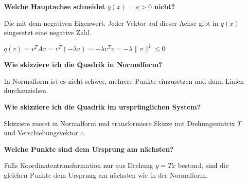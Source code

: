 {\begin{enumerate}[label=\protect\circled{\arabic*}]
\end{enumerate}

\vskip5pt
\textbf{Welche Hauptachse schneidet $q(x) = a > 0$ nicht?} \par
Die mit dem negativen Eigenwert. Jeder Vektor auf dieser Achse gibt in $q(x)$ eingesetzt eine negative Zahl.\par
$q(v) = v^TAv = v^T(-\lambda v) = -\lambda v^Tv = -\lambda \|v\|^2 \leq 0$
\vskip3pt

\textbf{Wie skizziere ich die Quadrik in Normalform?} \par
In Normalform ist es nicht schwer, mehrere Punkte einzusetzen und dann Linien durchzuziehen.\vskip3pt 

\textbf{Wie skizziere ich die Quadrik im ursprünglichen System?} \par
Skizziere zuerst in Normalform und transformiere Skizze mit Drehungsmatrix $T$ und Verschiebungsvektor $c$. \vskip3pt

\textbf{Welche Punkte sind dem Ursprung am nächsten?} \par
Falls Koordinatentransformation nur aus Drehung $y = Tx$ bestand, sind die gleichen Punkte dem Ursprung am nächsten wie in der Normalform.

}
\WhiteSpace




